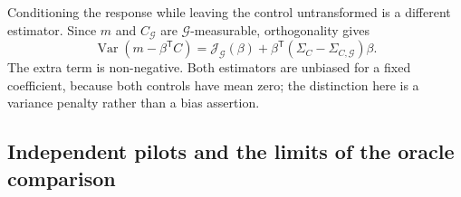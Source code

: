 \documentclass[11pt]{article}
\begin{document}
Conditioning the response while leaving the control untransformed is
a different estimator. Since $m$ and $C_{\mathcal G}$ are
$\mathcal G$-measurable, orthogonality gives
\begin{equation}
 \operatorname{Var}(m-\beta^{\mathsf T}C)
 =\mathcal J_{\mathcal G}(\beta)
 +\beta^{\mathsf T}(\Sigma_C-\Sigma_{C,\mathcal G})\beta.
 \label{eq:cgbm-unprojected-control-penalty}
\end{equation}
The extra term is non-negative. Both estimators are unbiased for a fixed
coefficient, because both controls have mean zero; the distinction here
is a variance penalty rather than a bias assertion.

\subsection{Independent pilots and the limits of the oracle comparison}
\label{app:cgbm-pilot}
\end{document}
